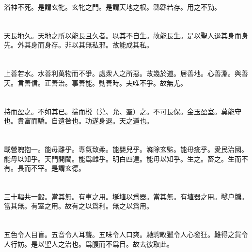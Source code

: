 \documentclass[a5paper]{ctexbook}
\begin{document}
    浴神不死。是謂玄牝。玄牝之門。是謂天地之根。緜緜若存。用之不勤。

    \chapter{}

    天長地久。天地之所以能長且久者。以其不自生。故能長生。是以聖人退其身而身先。外其身而身存。非以其無私邪。故能成其私。

    \chapter{}

    上善若水。水善利萬物而不爭。處衆人之所惡。故幾於道。居善地。心善淵。與善天。言善信。正善治。事善能。動善時。夫唯不爭。故無尤。

    \chapter{}

    持而盈之。不如其已。揣而棁（兑、允、羣）之。不可長保。金玉盈室。莫能守也。貴富而驕。自遺咎也。功遂身退。天之道也。

    \chapter{}

    載營魄抱一。能毋離乎。專氣致柔。能嬰兒乎。滌除玄監。能毋疵乎。愛民治國。能毋以知乎。天門開闔。能爲雌乎。明白四達。能毋以知乎。生之。畜之。生而不有。長而不宰。是謂玄德。

    \chapter{}

    三十輻共一轂。當其無。有車之用。埏埴以爲器。當其無。有埴器之用。鑿户牖。當其無。有室之用。故有之以爲利。無之以爲用。

    \chapter{}

    五色令人目盲。五音令人耳聾。五味令人口爽。馳騁畋獵令人心發狂。難得之貨令人行妨。是以聖人之治也。爲腹而不爲目。故去彼取此。

    \chapter{}
\end{document}
